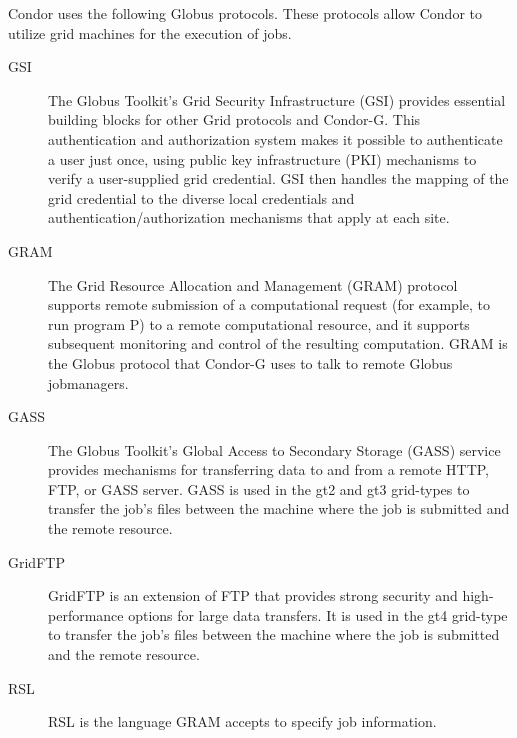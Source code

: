 Condor uses the following Globus protocols.
These protocols allow Condor to utilize grid machines for
the execution of jobs.
\begin{description}
\item[GSI]
The Globus Toolkit's Grid Security Infrastructure (GSI) provides essential
building blocks for other Grid protocols and Condor-G.
This authentication and authorization system
makes it possible to authenticate a user just once,
using public key infrastructure (PKI) mechanisms to verify
a user-supplied grid credential.
GSI then handles the mapping of the grid credential to the
diverse local credentials and authentication/authorization mechanisms that
apply at each site. 
\item[GRAM]
The Grid Resource Allocation and Management (GRAM) protocol supports remote
submission of a computational request (for example, to run program P)
to a remote computational resource,
and it supports subsequent monitoring and control of the resulting
computation. 
GRAM is the Globus protocol that Condor-G uses to talk to remote Globus
  jobmanagers.
\item[GASS]
The Globus Toolkit's Global Access to Secondary Storage (GASS) service provides
mechanisms for transferring data to and from a remote HTTP, FTP, or GASS server. 
GASS is used in the gt2 and gt3 grid-types to transfer the job's files
between the machine where the job is submitted and the remote resource.
\item[GridFTP]
GridFTP is an extension of FTP that provides strong security and 
high-performance options for large data transfers. It is used in the gt4
grid-type to transfer the job's files between the machine where the job
is submitted and the remote resource.
\item[RSL]
RSL is the language GRAM accepts to specify job information.
\end{description}


